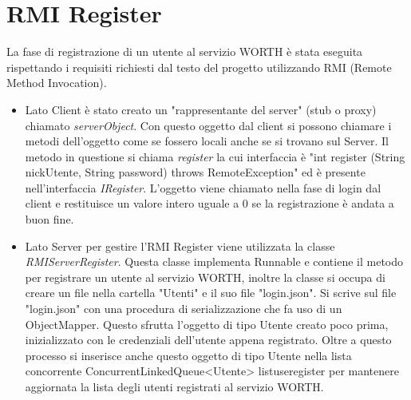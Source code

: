 \documentclass{article} %
\begin{document}
\section{RMI Register}
La fase di registrazione di un utente al servizio WORTH è stata eseguita rispettando i requisiti richiesti dal testo del progetto utilizzando RMI (Remote Method Invocation). 
\begin{itemize} 
    \item Lato Client è stato creato un "rappresentante del server" (stub o proxy) chiamato {\itshape serverObject}. Con questo oggetto dal client si possono chiamare i metodi dell'oggetto come se fossero locali anche se si trovano sul Server. Il metodo in questione si chiama {\itshape register} la cui interfaccia è "int register (String nickUtente, String password) throws RemoteException" ed è presente nell'interfaccia {\itshape IRegister}. L'oggetto viene chiamato nella fase di login dal client e restituisce un valore intero uguale a 0 se la registrazione è andata a buon fine. 
    \item Lato Server per gestire l'RMI Register viene utilizzata la classe {\itshape RMIServerRegister}. Questa classe implementa Runnable e contiene il metodo per registrare un utente al servizio WORTH, inoltre la classe si occupa di creare un file nella cartella "Utenti" e il suo file "login.json". Si scrive sul file "login.json" con una procedura di serializzazione che fa uso di un ObjectMapper. Questo sfrutta l'oggetto di tipo Utente creato poco prima, inizializzato con le credenziali dell'utente appena registrato. Oltre a questo processo si inserisce anche questo oggetto di tipo Utente nella lista concorrente ConcurrentLinkedQueue<Utente> listuseregister per mantenere aggiornata la lista degli utenti registrati al servizio WORTH. 
\end{itemize} 
\end{document}
